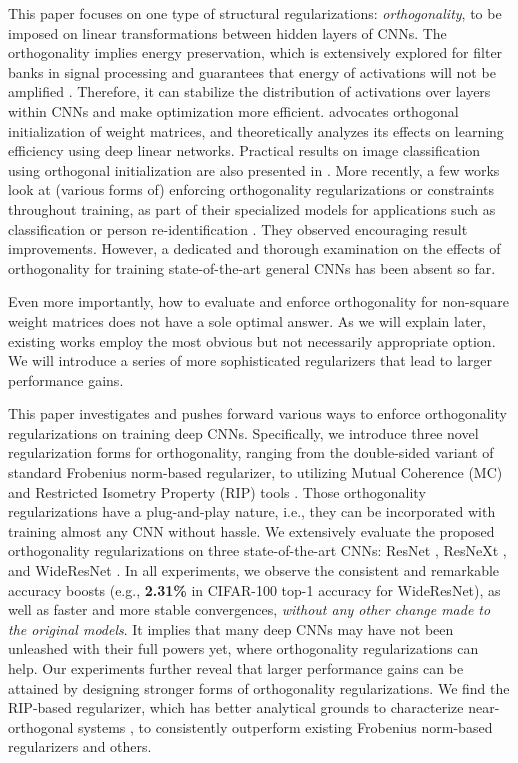 \documentclass{article}
\newcounter{ass_counter}
\begin{document}
This paper focuses on one type of structural regularizations: \textit{orthogonality}, to be imposed on linear transformations between hidden layers of CNNs. The orthogonality implies energy preservation, which is extensively explored for filter banks in signal processing and guarantees that energy of activations will not be amplified \cite{zhou2006special}. Therefore, it can stabilize the distribution of activations over layers within CNNs \cite{rodriguez2016regularizing,desjardins2015natural} and make optimization more efficient. \cite{saxe2013exact} advocates orthogonal initialization of weight matrices, and theoretically analyzes its effects on learning efficiency using deep linear networks. Practical results on image classification using orthogonal initialization are also presented in \cite{mishkin2015all}. More recently, a few works \cite{jia2016improving,harandi2016generalized,ozay2016optimization,xie2017all,huang2017orthogonal} look at (various forms of) enforcing orthogonality regularizations or constraints throughout training, as part of their specialized models for applications such as classification \cite{xie2017all} or person re-identification \cite{sun2017svdnet}. They observed encouraging result improvements. However, a dedicated and thorough examination on the effects of orthogonality for training state-of-the-art general CNNs has been absent so far.

Even more importantly, how to evaluate and enforce orthogonality for non-square weight matrices does not have a sole optimal answer. As we will explain later, existing works employ the most obvious but not necessarily appropriate option. We will introduce a series of more sophisticated regularizers that lead to larger performance gains.


This paper investigates and pushes forward various ways to enforce orthogonality regularizations on training deep CNNs. Specifically, we introduce three novel regularization forms for orthogonality, ranging from the double-sided variant of standard Frobenius norm-based regularizer, to utilizing Mutual Coherence (MC) and Restricted Isometry Property (RIP) tools \cite{candes2005decoding,donoho2006compressed,wang2016sparse}. Those orthogonality regularizations have a plug-and-play nature, i.e., they can be incorporated with training almost any CNN without hassle. We extensively evaluate the proposed orthogonality regularizations on three state-of-the-art CNNs: ResNet \cite{he2016deep}, ResNeXt \cite{xie2017aggregated}, and WideResNet \cite{zagoruyko2016wide}. In all experiments, we observe the consistent and remarkable accuracy boosts (e.g., \textbf{2.31\%} in CIFAR-100 top-1 accuracy for WideResNet), as well as faster and more stable convergences, \textit{without any other change made to the original models}. It implies that many deep CNNs may have not been unleashed with their full powers yet, where orthogonality regularizations can help.
Our experiments further reveal that larger performance gains can be attained by designing stronger forms of orthogonality regularizations. We find the RIP-based regularizer, which has better analytical grounds to characterize near-orthogonal systems \cite{zhang2011sparse}, to consistently outperform existing Frobenius norm-based regularizers and others.
\end{document}
